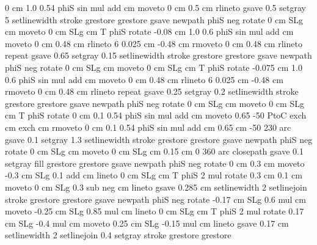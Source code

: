 {{        0 cm 1.0 0.54 phiS sin mul add cm moveto
        0 cm 0.5 cm rlineto
    gsave
         0.5 setgray
                5 setlinewidth
         stroke
    grestore
grestore
gsave
     newpath
        phiS neg rotate
        0 cm SLg cm moveto
        0 cm SLg cm T
        phiS rotate
        -0.08 cm 1.0 0.6 phiS sin mul add cm moveto
        0 cm 0.48 cm rlineto
        6 { 0.025 cm -0.48 cm rmoveto
         0 cm 0.48 cm rlineto } repeat
    gsave
         0.65 setgray
                0.15 setlinewidth
         stroke
    grestore
grestore
gsave
     newpath
        phiS neg rotate
        0 cm SLg cm moveto
        0 cm SLg cm T
        phiS rotate
        -0.075 cm 1.0 0.6 phiS sin mul add cm moveto
        0 cm 0.48 cm rlineto
        6 { 0.025 cm -0.48 cm rmoveto
         0 cm 0.48 cm rlineto } repeat
    gsave
         0.25 setgray
                0.2 setlinewidth
         stroke
    grestore
grestore
gsave
     newpath
        phiS neg rotate
        0 cm SLg cm moveto
        0 cm SLg cm T
        phiS rotate
        0 cm 0.1 0.54 phiS sin mul add cm moveto
        0.65 -50 PtoC exch cm exch cm  rmoveto
        0 cm 0.1 0.54 phiS sin mul add cm  0.65 cm -50 230 arc
    gsave
         0.1 setgray
                1.3 setlinewidth
         stroke
    grestore
grestore
gsave
     newpath
        phiS neg rotate
        0 cm SLg cm moveto
        0 cm SLg cm  0.15 cm 0 360 arc
      closepath
    gsave
         0.1 setgray
         fill
    grestore
grestore
gsave
     newpath
     phiS neg rotate
       0 cm 0.3 cm moveto
       -0.3 cm SLg 0.1 add cm lineto
       0 cm SLg cm T
        phiS 2 mul rotate
       0.3 cm 0.1 cm moveto
       0 cm SLg 0.3 sub neg cm lineto
     gsave
       0.285 cm setlinewidth
       2 setlinejoin
       \pst@usecolor\PoCFillCol
        stroke
    grestore
grestore
gsave
     newpath
     phiS neg rotate
       -0.17 cm SLg 0.6 mul cm moveto
       -0.25 cm  SLg 0.85 mul cm lineto
       0 cm SLg cm T
        phiS 2 mul rotate
       0.17 cm SLg -0.4 mul cm moveto
       0.25 cm  SLg -0.15 mul cm lineto
     gsave
       0.17 cm setlinewidth
       2 setlinejoin
       0.4 setgray
        stroke
    grestore
grestore
}}
